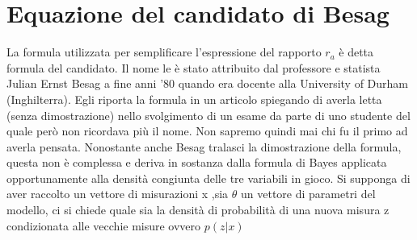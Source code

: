 \section{Equazione del candidato di Besag}
La formula utilizzata per semplificare l’espressione del rapporto $r_a$ è detta formula
del candidato. Il nome le è stato attribuito dal professore e statista Julian Ernst
Besag a fine anni ’80 quando era docente alla University of Durham (Inghilterra). Egli riporta
la formula in un articolo spiegando di averla letta (senza dimostrazione) nello svolgimento di un esame da parte di uno studente del quale però non ricordava più il
nome. Non sapremo quindi mai chi fu il primo ad averla pensata. Nonostante anche
Besag tralasci la dimostrazione della formula, questa non è complessa e deriva in
sostanza dalla formula di Bayes applicata opportunamente alla densità congiunta
delle tre variabili in gioco.
Si supponga di aver raccolto un vettore di misurazioni x ,sia $\theta$ un vettore di parametri
del modello, ci si chiede quale sia la densità di probabilità di una nuova misura z
condizionata alle vecchie misure ovvero $p(z|x)$


